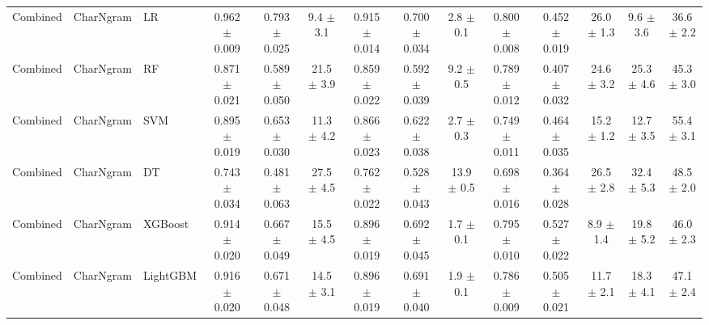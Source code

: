 \begin{tabular}{@{}lllccccccccccc@{}}
\midrule
Combined & CharNgram & LR & 0.962 $\pm$ 0.009 & 0.793 $\pm$ 0.025 & 9.4 $\pm$ 3.1 & 0.915 $\pm$ 0.014 & 0.700 $\pm$ 0.034 & 2.8 $\pm$ 0.1 & 0.800 $\pm$ 0.008 & 0.452 $\pm$ 0.019 & 26.0 $\pm$ 1.3 & 9.6 $\pm$ 3.6 & 36.6 $\pm$ 2.2\\
Combined & CharNgram & RF & 0.871 $\pm$ 0.021 & 0.589 $\pm$ 0.050 & 21.5 $\pm$ 3.9 & 0.859 $\pm$ 0.022 & 0.592 $\pm$ 0.039 & 9.2 $\pm$ 0.5 & 0.789 $\pm$ 0.012 & 0.407 $\pm$ 0.032 & 24.6 $\pm$ 3.2 & 25.3 $\pm$ 4.6 & 45.3 $\pm$ 3.0\\
Combined & CharNgram & SVM & 0.895 $\pm$ 0.019 & 0.653 $\pm$ 0.030 & 11.3 $\pm$ 4.2 & 0.866 $\pm$ 0.023 & 0.622 $\pm$ 0.038 & 2.7 $\pm$ 0.3 & 0.749 $\pm$ 0.011 & 0.464 $\pm$ 0.035 & 15.2 $\pm$ 1.2 & 12.7 $\pm$ 3.5 & 55.4 $\pm$ 3.1\\
Combined & CharNgram & DT & 0.743 $\pm$ 0.034 & 0.481 $\pm$ 0.063 & 27.5 $\pm$ 4.5 & 0.762 $\pm$ 0.022 & 0.528 $\pm$ 0.043 & 13.9 $\pm$ 0.5 & 0.698 $\pm$ 0.016 & 0.364 $\pm$ 0.028 & 26.5 $\pm$ 2.8 & 32.4 $\pm$ 5.3 & 48.5 $\pm$ 2.0\\
Combined & CharNgram & XGBoost & 0.914 $\pm$ 0.020 & 0.667 $\pm$ 0.049 & 15.5 $\pm$ 4.5 & 0.896 $\pm$ 0.019 & 0.692 $\pm$ 0.045 & 1.7 $\pm$ 0.1 & 0.795 $\pm$ 0.010 & 0.527 $\pm$ 0.022 & 8.9 $\pm$ 1.4 & 19.8 $\pm$ 5.2 & 46.0 $\pm$ 2.3\\
Combined & CharNgram & LightGBM & 0.916 $\pm$ 0.020 & 0.671 $\pm$ 0.048 & 14.5 $\pm$ 3.1 & 0.896 $\pm$ 0.019 & 0.691 $\pm$ 0.040 & 1.9 $\pm$ 0.1 & 0.786 $\pm$ 0.009 & 0.505 $\pm$ 0.021 & 11.7 $\pm$ 2.1 & 18.3 $\pm$ 4.1 & 47.1 $\pm$ 2.4\\
\bottomrule
\end{tabular}